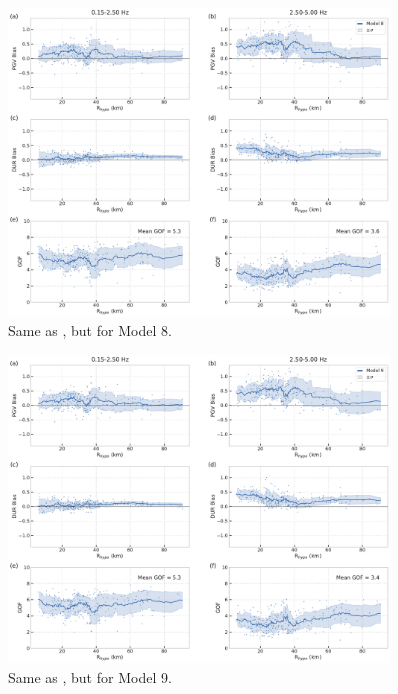 \begin{figure}[!ht]
  \centering
  \includegraphics[width=0.9\textwidth,height=0.9\textheight,keepaspectratio]{figures/figure_highf_S18.pdf}
  \caption{Same as , but for Model 8.
  }
\label{fig:highf-A18}
\end{figure}
\clearpage


\begin{figure}[!ht]
  \centering
  \includegraphics[width=0.9\textwidth,height=0.9\textheight,keepaspectratio]{figures/figure_highf_S19.pdf}
  \caption{Same as , but for Model 9.
  }
\label{fig:highf-A19}
\end{figure}
\clearpage


